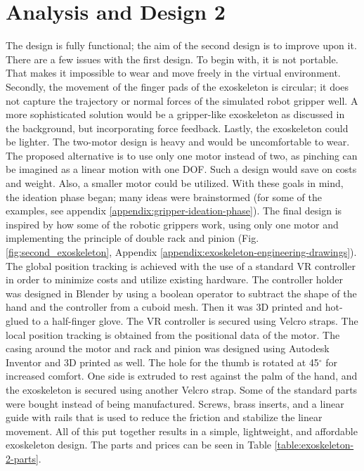 \newpage
\section{Analysis and Design 2}
The design \nameone is fully functional; the aim of the second design \nametwo is to improve upon it. There are a few issues with the first design. To begin with, it is not portable. That makes it impossible to wear and move freely in the virtual environment. Secondly, the movement of the finger pads of the exoskeleton is circular; it does not capture the trajectory or normal forces of the simulated robot gripper well. A more sophisticated solution would be a gripper-like exoskeleton \cite{dai2023gripper} as discussed in the background, but incorporating force feedback. Lastly, the exoskeleton could be lighter. The two-motor design is heavy and would be uncomfortable to wear. The proposed alternative is to use only one motor instead of two, as pinching can be imagined as a linear motion with one DOF. Such a design would save on costs and weight. Also, a smaller motor could be utilized. With these goals in mind, the ideation phase began; many ideas were brainstormed (for some of the examples, see appendix \ref{appendix:gripper-ideation-phase}). The final design is inspired by how some of the robotic grippers work, using only one motor and implementing the principle of double rack and pinion (Fig. \ref{fig:second_exoskeleton}, Appendix \ref{appendix:exoskeleton-engineering-drawings}). The global position tracking is achieved with the use of a standard VR controller in order to minimize costs and utilize existing hardware. The controller holder was designed in Blender by using a boolean operator to subtract the shape of the hand and the controller from a cuboid mesh. Then it was 3D printed and hot-glued to a half-finger glove. The VR controller is secured using Velcro straps. The local position tracking is obtained from the positional data of the motor. The casing around the motor and rack and pinion was designed using Autodesk Inventor and 3D printed as well. The hole for the thumb is rotated at 45$^{\circ}$ for increased comfort. One side is extruded to rest against the palm of the hand, and the exoskeleton is secured using another Velcro strap. Some of the standard parts were bought instead of being manufactured. Screws, brass inserts, and a linear guide with rails that is used to reduce the friction and stabilize the linear movement. All of this put together results in a simple, lightweight, and affordable exoskeleton design. The \nametwo parts and prices can be seen in Table \ref{table:exoskeleton-2-parts}.

